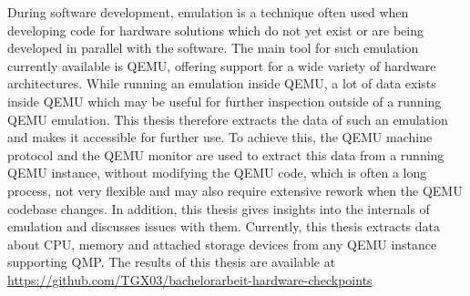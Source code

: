 
\Abstract
During software development, emulation is a technique often used when developing code for hardware solutions which do not yet exist
or are being developed in parallel with the software.
The main tool for such emulation currently available is QEMU, offering support for a wide variety of hardware architectures.
While running an emulation inside QEMU,
a lot of data exists inside QEMU which may be useful for further inspection outside of a running QEMU emulation.
This thesis therefore extracts the data of such an emulation and makes it accessible for further use.
To achieve this, the QEMU machine protocol and the QEMU monitor are used to extract this data from a running QEMU instance,
without modifying the QEMU code, which is often a long process,
not very flexible and may also require extensive rework when the QEMU codebase changes.
In addition, this thesis gives insights into the internals of emulation and discusses issues with them.
Currently, this thesis extracts data about CPU, memory and attached storage devices from any QEMU instance supporting QMP.
The results of this thesis are available at \url{https://github.com/TGX03/bachelorarbeit-hardware-checkpoints}